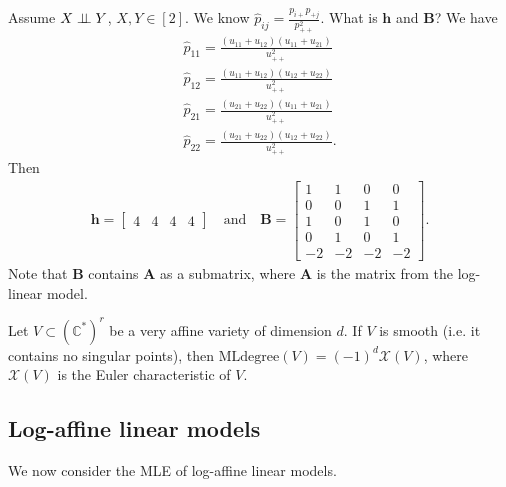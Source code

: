 \begin{eg}
  Assume \( X \perp \!\!\! \perp Y \), \( X,Y \in [2] \). We know \( \hat p_{ij} = \frac{p_{i+}p_{+j}}{p_{++}^2} \). What is \( \mathbf h \) and \( \mathbf B \)? We have 
  \begin{align*}
    \hat p_{11} = \frac{(u_{11} + u_{12})(u_{11} + u_{21})}{u_{++}^2} \\
    \hat p_{12} = \frac{(u_{11} + u_{12})(u_{12} + u_{22})}{u_{++}^2} \\
    \hat p_{21} = \frac{(u_{21} + u_{22})(u_{11} + u_{21})}{u_{++}^2} \\
    \hat p_{22} = \frac{(u_{21} + u_{22})(u_{12} + u_{22})}{u_{++}^2}.
  \end{align*}
  Then 
  \begin{align*}
    \mathbf h = \begin{bmatrix}
      4 & 4 & 4 & 4
    \end{bmatrix} \quad \text{and} \quad \mathbf B = \begin{bmatrix}
      1 & 1 & 0 & 0 \\ 0 & 0 & 1 & 1 \\  1 & 0 & 1 & 0 \\ 0 & 1 & 0 & 1 \\ -2 & -2 & -2 & -2
    \end{bmatrix}.
  \end{align*}
  Note that \( \mathbf{B} \) contains \( \mathbf{A} \) as a submatrix, where \( \mathbf{A} \) is the matrix from the log-linear model. 
\end{eg}

\begin{thm}
  Let \( V \subset (\mathbb{C}^*)^r \) be a very affine variety of dimension \( d \). If \( V \) is smooth (i.e. it contains no singular points), then \( \mathrm{MLdegree}(V) = (-1)^d \mathcal{X}(V) \), where \( \mathcal{X}(V) \) is the Euler characteristic of \( V \).
\end{thm}

\subsection{Log-affine linear models}
We now consider the MLE of log-affine linear models.

